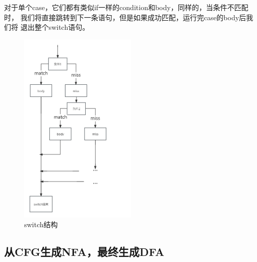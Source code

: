 对于单个case，它们都有类似if一样的condition和body，同样的，当条件不匹配时，
我们将直接跳转到下一条语句，但是如果成功匹配，运行完case的body后我们将
退出整个switch语句。
 \begin{figure}[htbp]
	\centering
	\includegraphics[width=0.5\textwidth]{pictures/switch结构.png}
	\caption{switch结构}
	\label{fig:switch结构}
\end{figure}
\subsection{从CFG生成NFA，最终生成DFA}
